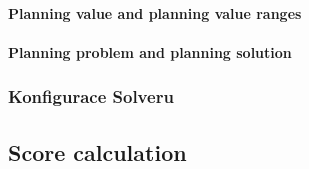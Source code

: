 \paragraph{Planning value and planning value ranges}
\paragraph{Planning problem and planning solution}

\subsubsection{Konfigurace Solveru}

\subsection{Score calculation}

